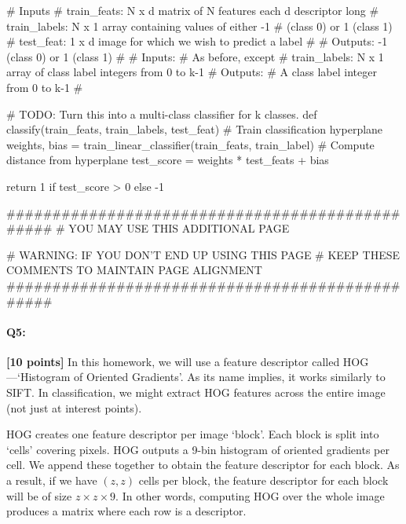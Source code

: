 \begin{tcolorbox}[enhanced jigsaw,breakable,pad at break*=1mm,colback=white!5!white,colframe=green!75!black,height fixed for=all]
\begin{python}
# Inputs
#   train_feats: N x d matrix of N features each d descriptor long
#   train_labels: N x 1 array containing values of either -1 
#               (class 0) or 1 (class 1)
#   test_feat: 1 x d image for which we wish to predict a label
#
#   Outputs: -1 (class 0) or 1 (class 1)
#
# Inputs:
#    As before, except
#    train_labels: N x 1 array of class label integers from 0 to k-1
# Outputs:
#    A class label integer from 0 to k-1
#

# TODO: Turn this into a multi-class classifier for k classes.
def classify(train_feats, train_labels, test_feat)
    # Train classification hyperplane
    weights, bias = train_linear_classifier(train_feats, train_label)
    # Compute distance from hyperplane
    test_score = weights * test_feats + bias

    return 1 if test_score > 0 else -1
    
    ################################################
    # YOU MAY USE THIS ADDITIONAL PAGE

    # WARNING: IF YOU DON'T END UP USING THIS PAGE
    # KEEP THESE COMMENTS TO MAINTAIN PAGE ALIGNMENT
    ################################################

\end{python}

\phantom{}

\end{tcolorbox}

\pagebreak

\paragraph{Q5:} \textbf{[10 points]} In this homework, we will use a feature descriptor called HOG---`Histogram of Oriented Gradients'. As its name implies, it works similarly to SIFT. In classification, we might extract HOG features across the entire image (not just at interest points).

HOG creates one feature descriptor per image `block'. Each block is split into `cells' covering pixels. HOG outputs a 9-bin histogram of oriented gradients per cell. We append these together to obtain the feature descriptor for each block. As a result, if we have $(z,z)$ cells per block, the feature descriptor for each block will be of size $z \times z \times 9$. In other words, computing HOG over the whole image produces a matrix where each row is a descriptor. 

